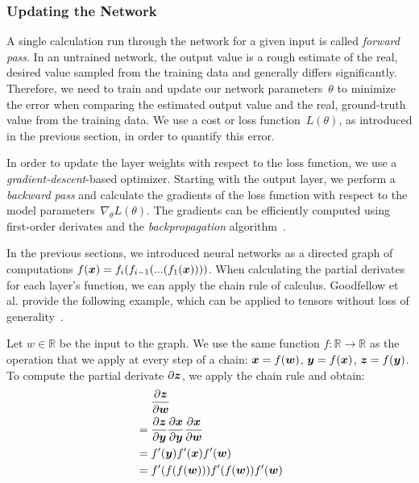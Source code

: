 \subsubsection{Updating the Network}
A single calculation run through the network for a given input is called \emph{forward pass}. In an untrained network, the output value is a rough estimate of the real, desired value sampled from the training data  and generally differs significantly. Therefore, we need to train and update our network parameters~$\theta$ to minimize the error when comparing the estimated output value and the real, ground-truth value from the training data. We use a cost or loss function~$L(\theta)$, as introduced in the previous section, in order to quantify this error.

In order to update the layer weights with respect to the loss function, we use a \emph{gradient-descent}-based optimizer. Starting with the output layer, we perform a \emph{backward pass} and calculate the gradients of the loss function with respect to the model parameters~$\nabla_\theta L(\theta)$. The gradients can be efficiently computed using first-order derivates and the \emph{backpropagation} algorithm~\cite{rumelhart1985learning}.

In the previous sections, we introduced neural networks as a directed graph of computations $ f(\boldsymbol{x}) = f_i(f_{i-1}(...(f_1(\boldsymbol{x})))) $. When calculating the partial derivates for each layer's function, we can apply the chain rule of calculus. Goodfellow et al. provide the following example, which can be applied to tensors without loss of generality~\cite{Goodfellow-et-al-2016}. 

Let $w \in\mathbb{R}$ be the input to the graph. We use the same function $f: \mathbb{R} \rightarrow \mathbb{R}$ as the operation that we apply at every step of a chain: $\boldsymbol{x} = f(\boldsymbol{w})$, $\boldsymbol{y} = f(\boldsymbol{x})$, $\boldsymbol{z} = f(\boldsymbol{y})$. To compute the partial derivate $\partial \boldsymbol{z}$, we apply the chain rule and obtain:
$$
\begin{aligned}
&\phantom{{}={}} \frac{\partial \vecsym{z}}{\partial \vecsym{w}} \\
&= \frac{\partial \vecsym{z}}{\partial \vecsym{y}} \frac{\partial \vecsym{x}}{\partial \vecsym{y}}  \frac{\partial \vecsym{x}}{\partial \vecsym{w}} \\
&= f'(\vecsym{y}) f'(\vecsym{x}) f'(\vecsym{w}) \\
&= f'(f(f(\vecsym{w})))f'(f(\vecsym{w}))f'(\vecsym{w}) \\
\end{aligned}
$$

